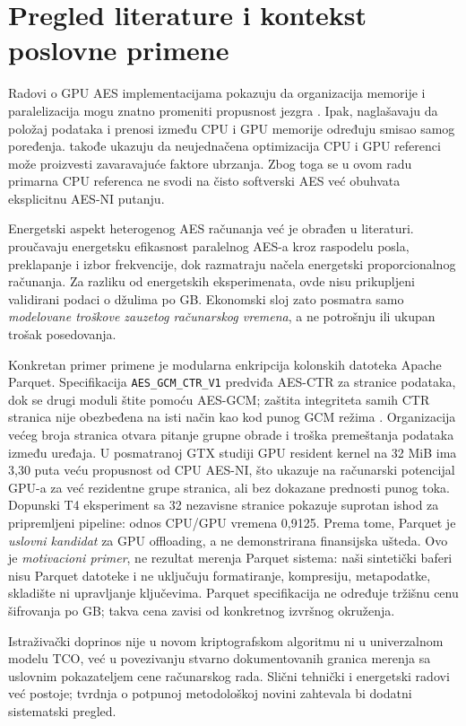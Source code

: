 \documentclass[11pt,b5paper]{article}
\begin{document}
\section{Pregled literature i kontekst poslovne primene}
Radovi o GPU AES implementacijama pokazuju da organizacija memorije i paralelizacija mogu znatno promeniti propusnost jezgra \citep{iwai2012,tezcan2021}. Ipak, \citet{gregg2011} naglašavaju da položaj podataka i prenosi između CPU i GPU memorije određuju smisao samog poređenja. \citet{lee2010} takođe ukazuju da neujednačena optimizacija CPU i GPU referenci može proizvesti zavaravajuće faktore ubrzanja. Zbog toga se u ovom radu primarna CPU referenca ne svodi na čisto softverski AES već obuhvata eksplicitnu AES-NI putanju.\par
Energetski aspekt heterogenog AES računanja već je obrađen u literaturi. \citet{fei2020} proučavaju energetsku efikasnost paralelnog AES-a kroz raspodelu posla, preklapanje i izbor frekvencije, dok \citet{barroso2007} razmatraju načela energetski proporcionalnog računanja. Za razliku od energetskih eksperimenata, ovde nisu prikupljeni validirani podaci o džulima po GB. Ekonomski sloj zato posmatra samo \emph{modelovane troškove zauzetog računarskog vremena}, a ne potrošnju ili ukupan trošak posedovanja.\par
Konkretan primer primene je modularna enkripcija kolonskih datoteka Apache Parquet. Specifikacija \texttt{AES\_GCM\_CTR\_V1} predviđa AES-CTR za stranice podataka, dok se drugi moduli štite pomoću AES-GCM; zaštita integriteta samih CTR stranica nije obezbeđena na isti način kao kod punog GCM režima \citep{parquet_encrypt}. Organizacija većeg broja stranica otvara pitanje grupne obrade i troška premeštanja podataka između uređaja. U posmatranoj GTX studiji GPU resident kernel na 32 MiB ima 3,30 puta veću propusnost od CPU AES-NI, što ukazuje na računarski potencijal GPU-a za već rezidentne grupe stranica, ali bez dokazane prednosti punog toka. Dopunski T4 eksperiment sa 32 nezavisne stranice pokazuje suprotan ishod za pripremljeni pipeline: odnos CPU/GPU vremena 0,9125. Prema tome, Parquet je \emph{uslovni kandidat} za GPU offloading, a ne demonstrirana finansijska ušteda. Ovo je \emph{motivacioni primer}, ne rezultat merenja Parquet sistema: naši sintetički baferi nisu Parquet datoteke i ne uključuju formatiranje, kompresiju, metapodatke, skladište ni upravljanje ključevima. Parquet specifikacija ne određuje tržišnu cenu šifrovanja po GB; takva cena zavisi od konkretnog izvršnog okruženja.\par
Istraživački doprinos nije u novom kriptografskom algoritmu ni u univerzalnom modelu TCO, već u povezivanju stvarno dokumentovanih granica merenja sa uslovnim pokazateljem cene računarskog rada. Slični tehnički i energetski radovi već postoje; tvrdnja o potpunoj metodološkoj novini zahtevala bi dodatni sistematski pregled.
\end{document}
